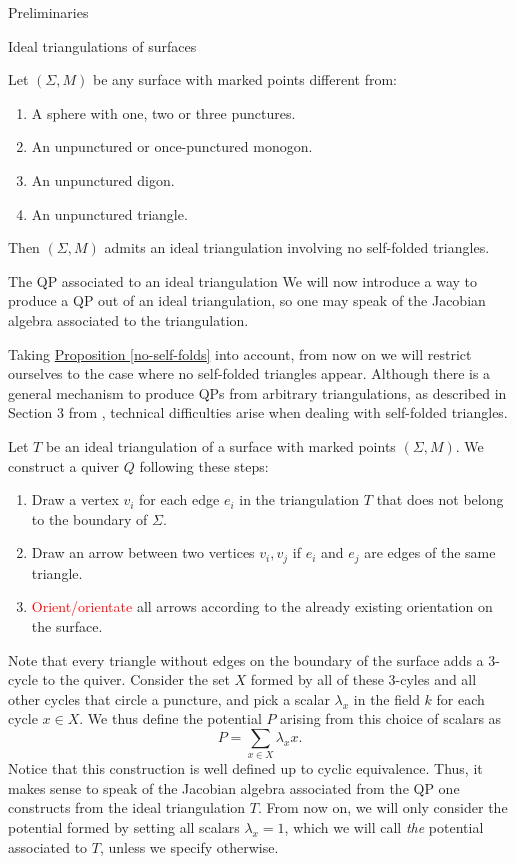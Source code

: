 \begin{chapter}{Preliminaries}
\begin{section}{Ideal triangulations of surfaces}
\begin{prop}\label{no-self-folds} Let $(\Sigma, M)$ be any surface with marked points different from:
\begin{enumerate}
\item A sphere with one, two or three punctures.
\item An unpunctured or once-punctured monogon.
\item An unpunctured digon.
\item An unpunctured triangle.
\end{enumerate}
Then $(\Sigma, M)$ admits an ideal triangulation involving no self-folded triangles. \hfill\qedsymbol
\end{prop}
\end{section}

\begin{section}{The QP associated to an ideal triangulation}\label{qp}
We will now introduce a way to produce a QP out of an ideal triangulation, so one may speak of the Jacobian algebra associated to the triangulation.

Taking \hyperref[no-self-folds]{Proposition \ref*{no-self-folds}} into account, from now on we will restrict ourselves to the case where no self-folded triangles appear. Although there is a general mechanism to produce QPs from arbitrary triangulations, as described in Section 3 from \cite{LF09}, technical difficulties arise when dealing with self-folded triangles.

Let $T$ be an ideal triangulation of a surface with marked points $(\Sigma, M)$. We construct a quiver $Q$ following these steps:
\begin{enumerate}
\item Draw a vertex $v_i$ for each edge $e_i$ in the triangulation $T$ that does not belong to the boundary of $\Sigma$.
\item Draw an arrow between two vertices $v_i, v_j$ if $e_i$ and $e_j$ are edges of the same triangle.
\item \textcolor{red}{Orient/orientate} all arrows according to the already existing orientation on the surface.
\end{enumerate}

Note that every triangle without edges on the boundary of the surface adds a 3-cycle to the quiver. Consider the set $X$ formed by all of these 3-cyles and all other cycles that circle a puncture, and pick a scalar $\lambda_x$ in the field $k$ for each cycle $x\in X$. We thus define the potential $P$ arising from this choice of scalars as
\[P=\sum_{x\in X} \lambda_x x.\]
Notice that this construction is well defined up to cyclic equivalence. Thus, it makes sense to speak of the Jacobian algebra associated from the QP one constructs from the ideal triangulation $T$. From now on, we will only consider the potential formed by setting all scalars $\lambda_x=1$, which we will call \emph{the} potential associated to $T$, unless we specify otherwise.


\end{section}
\end{chapter}
